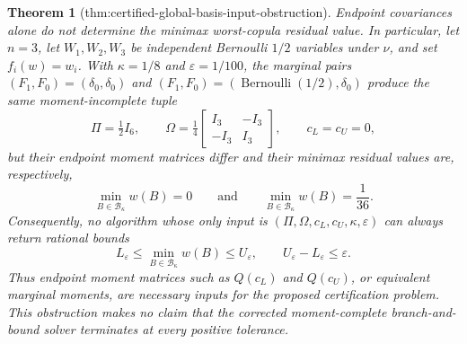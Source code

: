 \documentclass{article}
\newtheorem{theorem}{Theorem}
\begin{document}
\begin{theorem}[thm:certified-global-basis-input-obstruction]\label{thm:certified-global-basis-input-obstruction}
Endpoint covariances alone do not determine the minimax worst-copula residual value.  In particular, let \(n=3\), let \(W_1,W_2,W_3\) be independent Bernoulli \(1/2\) variables under \(\nu\), and set \(f_i(w)=w_i\).  With \(\kappa=1/8\) and \(\varepsilon=1/100\), the marginal pairs \((F_1,F_0)=(\delta_0,\delta_0)\) and \((F_1,F_0)=(\operatorname{Bernoulli}(1/2),\delta_0)\) produce the same moment-incomplete tuple
\[
\Pi=\tfrac12 I_6,\qquad
\Omega=\tfrac14\begin{bmatrix}I_3&-I_3\\-I_3&I_3\end{bmatrix},
\qquad c_L=c_U=0,
\]
but their endpoint moment matrices differ and their minimax residual values are, respectively,
\[
\min_{B\in\mathcal B_\kappa}w(B)=0
\qquad\text{and}\qquad
\min_{B\in\mathcal B_\kappa}w(B)=\frac1{36}.
\]
Consequently, no algorithm whose only input is \((\Pi,\Omega,c_L,c_U,\kappa,\varepsilon)\) can always return rational bounds
\[
L_{\varepsilon}\le \min_{B\in\mathcal B_\kappa}w(B)\le U_{\varepsilon},
\qquad U_{\varepsilon}-L_{\varepsilon}\le\varepsilon.
\]
Thus endpoint moment matrices such as \(Q(c_L)\) and \(Q(c_U)\), or equivalent marginal moments, are necessary inputs for the proposed certification problem.  This obstruction makes no claim that the corrected moment-complete branch-and-bound solver terminates at every positive tolerance.
\end{theorem}
\end{document}
